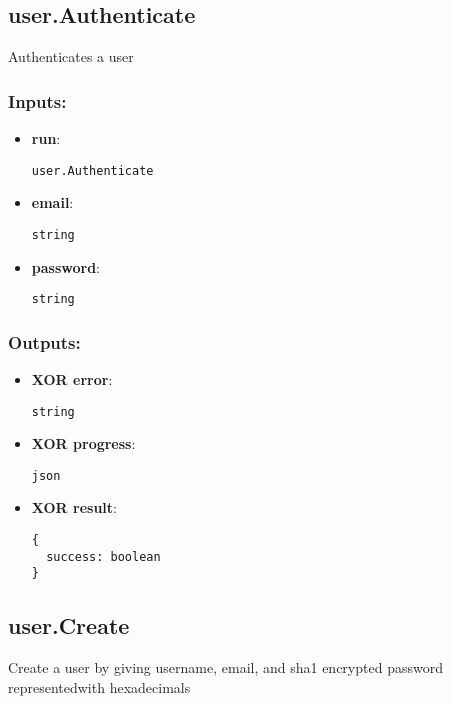 \subsection{user.Authenticate}
\label{ch:builtinservices:user.Authenticate}
Authenticates a user
\subsubsection*{Inputs:}
\begin{itemize}
    \item \textbf{run}: 
\begin{lstlisting}
user.Authenticate
\end{lstlisting}
    \item \textbf{email}: 
\begin{lstlisting}
string
\end{lstlisting}
    \item \textbf{password}: 
\begin{lstlisting}
string
\end{lstlisting}
  \end{itemize}

\subsubsection*{Outputs:}
\begin{itemize}
    \item \textbf{XOR error}: 
\begin{lstlisting}
string
\end{lstlisting}
    \item \textbf{XOR progress}: 
\begin{lstlisting}
json
\end{lstlisting}
    \item \textbf{XOR result}: 
\begin{lstlisting}
{
  success: boolean
}
\end{lstlisting}
  \end{itemize}

\subsection{user.Create}
\label{ch:builtinservices:user.Create}
Create a user by giving username, email, and sha1 encrypted password representedwith hexadecimals
